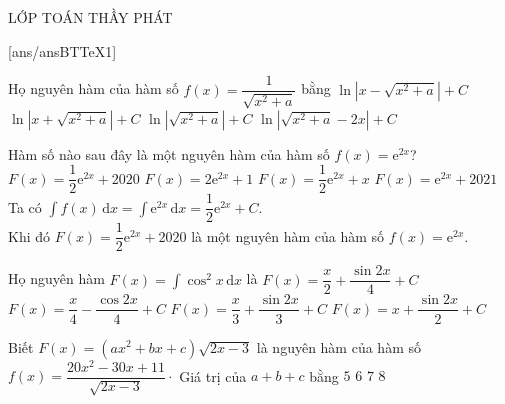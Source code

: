 \begin{name}
{\tenchude}{\tendethi}{LỚP TOÁN THẦY PHÁT}{\thoigian}
\end{name}
[ans/ansBTTeX1]
\begin{ex}%
Họ nguyên hàm của hàm số $f(x)=\dfrac{1}{\sqrt{x^{2}+a}}$ bằng
\choice
{$\ln \left|x-\sqrt{x^{2}+a}\right|+C$}
{\True$\ln \left|x+\sqrt{x^{2}+a}\right|+C$}
{$\ln \left|\sqrt{x^{2}+a}\right|+C$}
{$\ln \left|\sqrt{x^{2}+a}-2 x\right|+C$}
\end{ex}

\begin{ex}%
Hàm số nào sau đây là một nguyên hàm của hàm số $f(x)=\mathrm{e}^{2x}$?
\choice
{\True $F(x)=\dfrac{1}{2}\mathrm{e}^{2x}+2020$}
{$F(x)=2\mathrm{e}^{2x}+1$}
{$F(x)=\dfrac{1}{2}\mathrm{e}^{2x}+x$}
{$F(x)=\mathrm{e}^{2x}+2021$}
\loigiai
{
Ta có $\displaystyle\int f(x) \mathrm{\,d}x=\displaystyle\int \mathrm{e}^{2x} \mathrm{\,d}x=\dfrac{1}{2}\mathrm{e}^{2x}+C$.\\
Khi đó $F(x)=\dfrac{1}{2}\mathrm{e}^{2x}+2020$ là một nguyên hàm của hàm số $f(x)=\mathrm{e}^{2x}$.
}
\end{ex}

\begin{ex}%
Họ nguyên hàm $F(x)=\displaystyle\int\cos^{2}x\mathrm{\,d}x$ là
\choice
{\True $F(x)=\dfrac{x}{2}+\dfrac{\sin 2x}{4}+C$}
{$F(x)=\dfrac{x}{4}-\dfrac{\cos 2x}{4}+C$}
{$F(x)=\dfrac{x}{3}+\dfrac{\sin 2x}{3}+C$}
{$F(x)=x+\dfrac{\sin 2x}{2}+C$}
\end{ex}

\begin{ex}%
Biết $F(x)=(a x^2+b x+c) \sqrt{2x-3}$ là nguyên hàm của hàm số $f(x)=\dfrac{20 x^2-30 x+11}{\sqrt{2x-3}} \cdot$ Giá trị của $a+b+c$ bằng
\choice
{$5$}
{$6$}
{\True $7$}
{$8$}
\end{ex}


